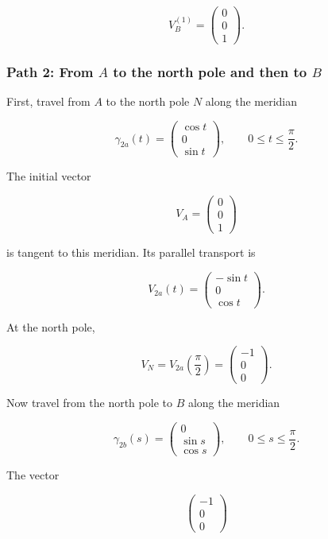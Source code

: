 \documentclass[12pt,a4paper]{article}
\theoremstyle{notespace}
\begin{document}
\[
\boxed{
	V_B^{(1)}
	=
	\begin{pmatrix}
		0\\
		0\\
		1
	\end{pmatrix}.
}
\]

\subsubsection{Path 2: From \(A\) to the north pole and then to \(B\)}

First, travel from \(A\) to the north pole \(N\) along the meridian

\[
\gamma_{2a}(t)
=
\begin{pmatrix}
	\cos t\\
	0\\
	\sin t
\end{pmatrix},
\qquad
0\leq t\leq\frac{\pi}{2}.
\]

The initial vector

\[
V_A=
\begin{pmatrix}
	0\\
	0\\
	1
\end{pmatrix}
\]

is tangent to this meridian. Its parallel transport is

\[
V_{2a}(t)
=
\begin{pmatrix}
	-\sin t\\
	0\\
	\cos t
\end{pmatrix}.
\]

At the north pole,

\[
V_N
=
V_{2a}\left(\frac{\pi}{2}\right)
=
\begin{pmatrix}
	-1\\
	0\\
	0
\end{pmatrix}.
\]

Now travel from the north pole to \(B\) along the meridian

\[
\gamma_{2b}(s)
=
\begin{pmatrix}
	0\\
	\sin s\\
	\cos s
\end{pmatrix},
\qquad
0\leq s\leq\frac{\pi}{2}.
\]

The vector

\[
\begin{pmatrix}
	-1\\
	0\\
	0
\end{pmatrix}
\]
\end{document}
